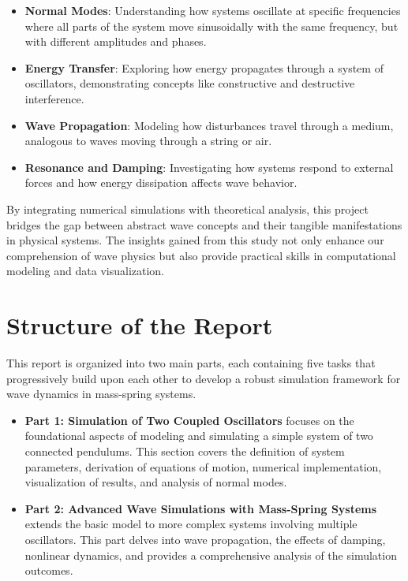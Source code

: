 \documentclass[12pt]{report} %
\begin{document}
\begin{itemize}
    \item \textbf{Normal Modes}: Understanding how systems oscillate at specific frequencies where all parts of the system move sinusoidally with the same frequency, but with different amplitudes and phases.
    \item \textbf{Energy Transfer}: Exploring how energy propagates through a system of oscillators, demonstrating concepts like constructive and destructive interference.
    \item \textbf{Wave Propagation}: Modeling how disturbances travel through a medium, analogous to waves moving through a string or air.
    \item \textbf{Resonance and Damping}: Investigating how systems respond to external forces and how energy dissipation affects wave behavior.
\end{itemize}

By integrating numerical simulations with theoretical analysis, this project bridges the gap between abstract wave concepts and their tangible manifestations in physical systems. The insights gained from this study not only enhance our comprehension of wave physics but also provide practical skills in computational modeling and data visualization.

\section{Structure of the Report}

This report is organized into two main parts, each containing five tasks that progressively build upon each other to develop a robust simulation framework for wave dynamics in mass-spring systems.

\begin{itemize}
    \item \textbf{Part 1: Simulation of Two Coupled Oscillators} focuses on the foundational aspects of modeling and simulating a simple system of two connected pendulums. This section covers the definition of system parameters, derivation of equations of motion, numerical implementation, visualization of results, and analysis of normal modes.
    \item \textbf{Part 2: Advanced Wave Simulations with Mass-Spring Systems} extends the basic model to more complex systems involving multiple oscillators. This part delves into wave propagation, the effects of damping, nonlinear dynamics, and provides a comprehensive analysis of the simulation outcomes.
\end{itemize}
\end{document}
